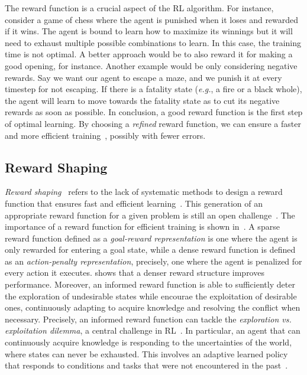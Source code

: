 The reward function is a crucial aspect of the RL algorithm.
For instance, consider a game of chess 
where the agent is punished when it loses and rewarded if it wins. The agent is bound to learn how to 
maximize its winnings but it will need to exhaust multiple possible combinations to learn. In this case, 
the training time is not optimal. A better approach would be to also reward it for making a good opening, for instance. 
Another example would be only considering negative rewards. Say we want our agent to escape a maze, and we punish it at every timestep for not escaping. 
If there is a fatality state (\emph{e.g.}, a fire or a black whole), the agent will learn to move towards the fatality state as to cut its negative rewards as soon as possible. 
In conclusion, a good reward function is the first step of optimal learning.
By choosing a \emph{refined} reward function, 
we can ensure a faster and more efficient training~\cite{Koenig1996}, possibly with fewer errors. 

\subsection{Reward Shaping}
\label{sec:challenges}

\emph{Reward shaping}~\cite{laud2011} refers to the lack of systematic methods to design a reward
  function that ensures fast and efficient learning~\cite{Koenig1996}. This generation of an appropriate 
reward function for a given problem is still an open challenge~\cite{kober2013}.
%
The importance of a reward function for efficient training is shown in~\cite{Koenig1996}.
A sparse reward function defined as a \emph{goal-reward representation} is one where the agent is only rewarded 
for entering a goal state, while a dense reward function is defined as an \emph{action-penalty representation}, precisely, one 
where the agent is penalized for every action it executes. \cite{Koenig1996} shows that a denser reward structure improves performance. 
%
Moreover, an informed reward function is able to sufficiently deter the exploration of 
undesirable states while encourae the exploitation of desirable ones, continuously adapting to 
acquire knowledge and resolving the conflict when necessary. Precisely, an informed reward function 
can tackle the \emph{exploration vs. exploitation dilemma}, a central challenge in RL~\cite{Kaelbling1996ReinforcementLA}. 
%
In particular, an agent that can continuously acquire knowledge is responding to the uncertainties of the world, where states can never be exhausted. 
This involves an adaptive learned policy that responds to conditions and tasks that were not encountered in the past~\cite{gupta_meta-reinforcement_2018,schweighofer_meta-learning_2003}.
%

